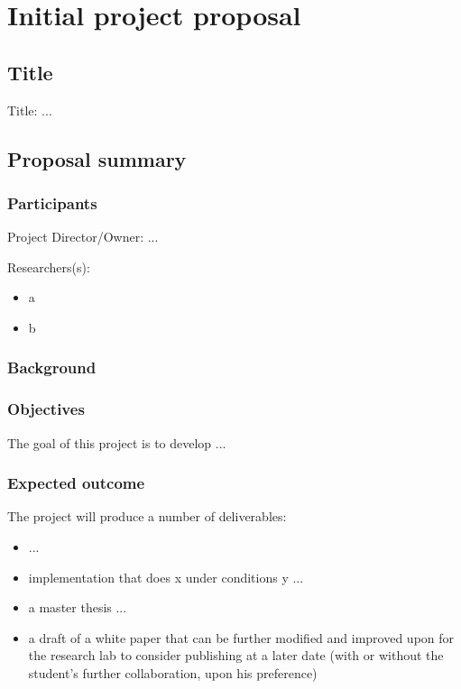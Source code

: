\chapter{Initial project proposal}
\section{Title}
Title: ...
\section{Proposal summary}
\subsection{Participants}
Project Director/Owner: ...

Researchers(s):
\begin{itemize}
    \item a
    \item b
\end{itemize}

\subsection{Background}
\subsection{Objectives}
The goal of this project is to develop ...
\subsection{Expected outcome}
The project will produce a number of deliverables:
\begin{itemize}
    \item ...
    \item implementation that does x under conditions y ...
    \item a master thesis ...
    \item a draft of a white paper that can be further modified and improved upon for the research lab to consider publishing at a later date (with or without the student's further collaboration, upon his preference)
\end{itemize}

